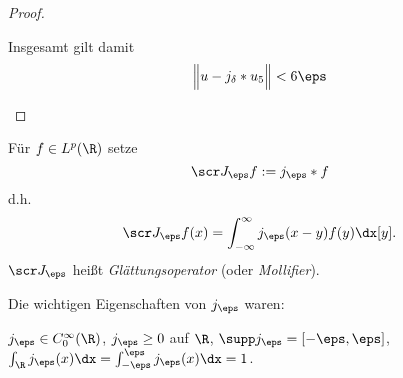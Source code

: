\begin{st}
\begin{proof}
\begin{enumerate}[1)]
				Insgesamt gilt damit
				\[
					\Big\|u - j_\delta \ast u_5 \Big\| < 6\eps
				\]
		\end{enumerate}
	\end{proof}
\end{st}

\begin{df} \label{4.19}
	Für $f \in L^p(\R)$ setze
	\[
		\scr J_\eps f := j_\eps \ast f
	\]
	d.h.
	\[
		\scr J_\eps f(x) = \int_{-\infty}^\infty j_\eps (x-y) f(y) \dx[y].
	\]
	$\scr J_\eps$ heißt \emph{Glättungsoperator} (oder \emph{Mollifier}).
	\begin{note}
		Die wichtigen Eigenschaften von $j_\eps$ waren:

		$j_\eps \in C_0^\infty(\R)$, $j_\eps \ge 0$ auf $\R$, $\supp j_\eps = [-\eps,\eps]$, $\int_{\R} j_\eps(x) \dx = \int_{-\eps}^\eps j_\eps(x) \dx = 1$.
	\end{note}
\end{df}

